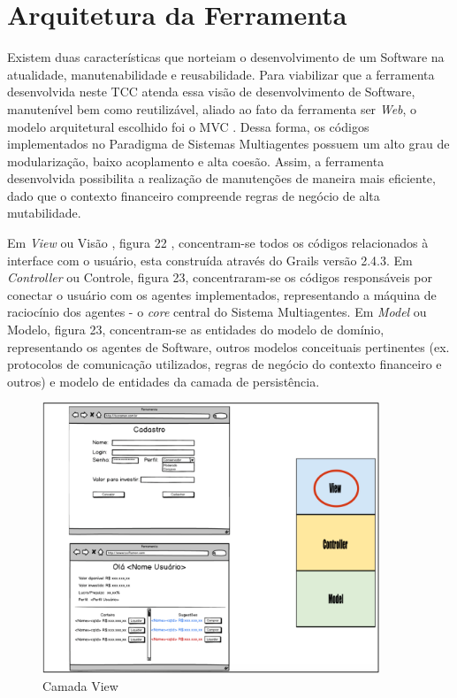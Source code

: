 \section{Arquitetura da Ferramenta}

Existem duas características que norteiam o desenvolvimento de um Software na atualidade, manutenabilidade e reusabilidade. Para viabilizar que a ferramenta desenvolvida neste TCC atenda essa visão de desenvolvimento de Software, manutenível bem como reutilizável, aliado ao fato da ferramenta ser \textit{Web}, o modelo arquitetural escolhido foi o MVC \cite{krasner1988}. Dessa forma, os códigos implementados no Paradigma de Sistemas Multiagentes possuem um alto grau de modularização, baixo acoplamento e alta coesão. Assim, a ferramenta desenvolvida possibilita a realização de  manutenções de maneira mais eficiente, dado que o contexto financeiro compreende regras de negócio de alta mutabilidade. 

Em \textit{View} ou Visão , figura 22 , concentram-se todos os códigos relacionados à interface com o usuário, esta construída através do Grails versão 2.4.3. Em \textit{Controller} ou Controle, figura 23, concentraram-se os códigos responsáveis por conectar o usuário com os agentes implementados, representando a máquina de raciocínio dos agentes - o \textit{core} central do Sistema Multiagentes. Em \textit{Model} ou Modelo, figura 23, concentram-se as entidades do modelo de domínio, representando os agentes de Software, outros modelos conceituais pertinentes (ex. protocolos de comunicação utilizados, regras de negócio do contexto financeiro e outros) e modelo de entidades da camada de persistência.

\begin{figure}[h!]
\centering
\label{f17}
\includegraphics[width=0.9\textwidth]{figuras/f24}
\caption{Camada View}
\end{figure}

